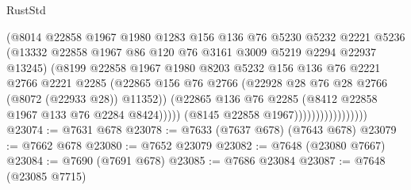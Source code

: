 \begin{lexlean}{RustStd}
\begin{coremodule}
                                      (@8014
                                        @22858
                                        @1967
                                        @1980
                                        @1283
                                        @156
                                        @136
                                        @76
                                        @5230
                                        @5232
                                        @2221
                                        @5236
                                        (@13332
                                          @22858
                                          @1967
                                          @86
                                          @120
                                          @76
                                          @3161
                                          @3009
                                          @5219
                                          @2294
                                          @22937
                                          @13245)
                                        (@8199
                                          @22858
                                          @1967
                                          @1980
                                          @8203
                                          @5232
                                          @156
                                          @136
                                          @76
                                          @2221
                                          @2766
                                          @2221
                                          @2285
                                          (@22865
                                            @156
                                            @76
                                            @2766
                                            (@22928 @28 @76 @28 @2766 (@8072 (@22933 @28)) @11352))
                                          (@22865
                                            @136
                                            @76
                                            @2285
                                            (@8412 @22858 @1967 @133 @76 @2284 @8424)))))
                                    (@8145 @22858 @1967)))))))))))))))))
@23074 := @7631 @678
@23078 := @7633 (@7637 @678) (@7643 @678)
@23079 := @7662 @678
@23080 := @7652 @23079
@23082 := @7648 (@23080 @7667)
@23084 := @7690 (@7691 @678)
@23085 := @7686 @23084
@23087 := @7648 (@23085 @7715)

\end{coremodule}
\end{lexlean}
